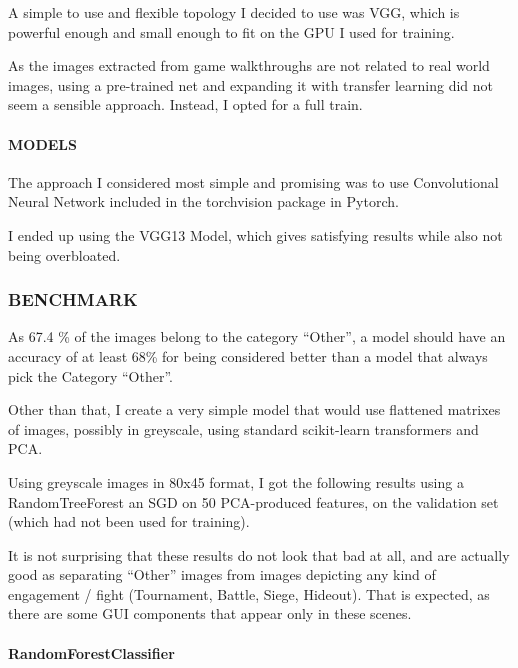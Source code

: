 \documentclass[
]{article}
\begin{document}
A simple to use and flexible topology I decided to use was VGG, which is
powerful enough and small enough to fit on the GPU I used for training.

As the images extracted from game walkthroughs are not related to real
world images, using a pre-trained net and expanding it with transfer
learning did not seem a sensible approach. Instead, I opted for a full
train.

\hypertarget{models}{%
\paragraph{MODELS}\label{models}}

The approach I considered most simple and promising was to use
Convolutional Neural Network included in the torchvision package in
Pytorch.

I ended up using the VGG13 Model, which gives satisfying results while
also not being overbloated.

\hypertarget{benchmark}{%
\subsubsection{BENCHMARK}\label{benchmark}}

As 67.4 \% of the images belong to the category ``Other'', a model
should have an accuracy of at least 68\% for being considered better
than a model that always pick the Category ``Other''.

Other than that, I create a very simple model that would use flattened
matrixes of images, possibly in greyscale, using standard scikit-learn
transformers and PCA.

Using greyscale images in 80x45 format, I got the following results
using a RandomTreeForest an SGD on 50 PCA-produced features, on the
validation set (which had not been used for training).

It is not surprising that these results do not look that bad at all, and
are actually good as separating ``Other'' images from images depicting
any kind of engagement / fight (Tournament, Battle, Siege, Hideout).
That is expected, as there are some GUI components that appear only in
these scenes.

\hypertarget{randomforestclassifier}{%
\paragraph{RandomForestClassifier}\label{randomforestclassifier}}
\end{document}
